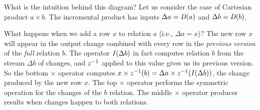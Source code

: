 What is the intuition behind this diagram?  Let us consider the case
of Cartesian product $a \times b$.  The incremental product has inputs
$\Delta a = \mathit{D}(a)$ and $\Delta b = \mathit{D}(b)$.

What happens when we add a row $x$ to relation $a$ (i.e., $\Delta a =
x$)?  The new row $x$ will appear in the output change combined with
every row in the \emph{previous version} of the \emph{full} relation
$b$.  The operator $\mathit{I}(\Delta b)$ in fact computes relation $b$ from
the stream $\Delta b$ of changes, and $z^{-1}$ applied to this value
gives us its previous version.  So the bottom $\times$ operator
computes $x \times z^{-1}(b) = \Delta a \times z^{-1}(\mathit{I}(\Delta b))$, the
change produced by the new row $x$.  The top $\times$ operator
performs the symmetric operation for the changes of the $b$ relation.
The middle $\times$ operator produces results when changes happen to
both relations.

%
